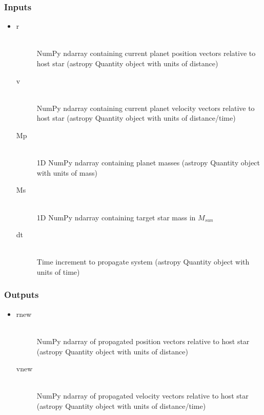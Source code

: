 \documentclass[cleanfoot]{asme2ej}
\begin{document}
\subsubsection*{Inputs}
\begin{itemize}
    \item 
    \begin{description}
        \item[r] \hfill \\
        NumPy ndarray containing current planet position vectors relative to host star (astropy Quantity object with units of distance)
        \item[v] \hfill \\
        NumPy ndarray containing current planet velocity vectors relative to host star (astropy Quantity object with units of distance/time)
        \item[Mp] \hfill \\
        1D NumPy ndarray containing planet masses (astropy Quantity object with units of mass)
        \item[Ms] \hfill \\
        1D NumPy ndarray containing target star mass in $ M_{sun} $
        \item[dt] \hfill \\
        Time increment to propagate system (astropy Quantity object with units of time)
    \end{description}
\end{itemize}

\subsubsection*{Outputs}
\begin{itemize}
    \item 
    \begin{description}
        \item[rnew] \hfill \\
        NumPy ndarray of propagated position vectors relative to host star (astropy Quantity object with units of distance)
        \item[vnew] \hfill \\
        NumPy ndarray of propagated velocity vectors relative to host star (astropy Quantity object with units of distance/time)
    \end{description}
\end{itemize}

\end{document}

